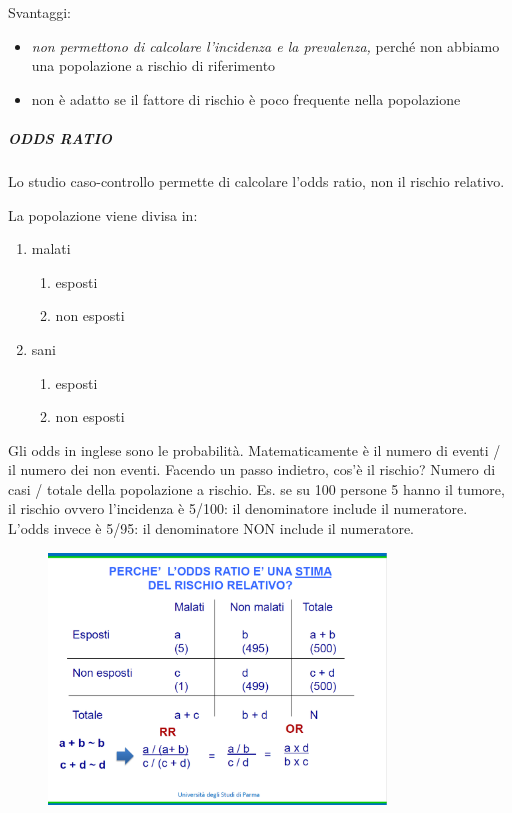 Svantaggi:

\begin{itemize}
\item
  \emph{non permettono di calcolare l'incidenza e la prevalenza,} perché
  non abbiamo una popolazione a rischio di riferimento
\item
  non è adatto se il fattore di rischio è poco frequente nella
  popolazione
\end{itemize}

\subparagraph{ODDS RATIO }


Lo studio caso-controllo permette di calcolare l'odds ratio, non il
rischio relativo.

La popolazione viene divisa in:

\begin{enumerate}
\def\labelenumi{\arabic{enumi}.}
\item
  malati

  \begin{enumerate}
  \def\labelenumii{\alph{enumii}.}
  \item
    esposti
  \item
    non esposti
  \end{enumerate}
\item
  sani

  \begin{enumerate}
  \def\labelenumii{\alph{enumii}.}
  \item
    esposti
  \item
    non esposti
  \end{enumerate}
\end{enumerate}

Gli odds in inglese sono le probabilità. Matematicamente è il numero di
eventi / il numero dei non eventi. Facendo un passo indietro, cos'è il
rischio? Numero di casi / totale della popolazione a rischio. Es. se su
100 persone 5 hanno il tumore, il rischio ovvero l'incidenza è 5/100: il
denominatore include il numeratore. L'odds invece è 5/95: il
denominatore NON include il numeratore.

\begin{figure}[!ht]
\centering
	\includegraphics[width=0.8\textwidth]{04/image6.png}
	\end{figure}

